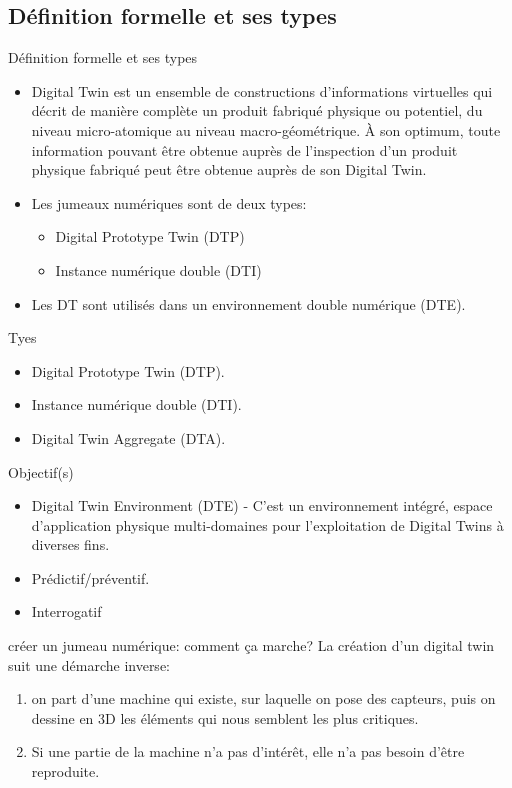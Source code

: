 \documentclass{beamer}
\begin{document}
   \subsection{Définition formelle et ses types}
 \begin{frame}{Définition formelle et ses types}
   \begin{itemize}
     \item Digital Twin est un ensemble de constructions d'informations virtuelles qui décrit de manière complète un produit fabriqué physique ou potentiel, du niveau micro-atomique au niveau macro-géométrique. À son optimum, toute information pouvant être obtenue auprès de l’inspection d’un produit physique fabriqué peut être obtenue auprès de son Digital Twin.
     \item Les jumeaux numériques sont de deux types:
       \begin{itemize}
         \item Digital Prototype Twin (DTP)
         \item Instance numérique double (DTI)
       \end{itemize}
     \item Les DT sont utilisés dans un environnement double numérique (DTE).
   \end{itemize}
  \end{frame}
 \begin{frame}{Tyes}
   \begin{itemize}
     \item Digital Prototype Twin (DTP).
     \item Instance numérique double (DTI).
     \item Digital Twin Aggregate (DTA).
   \end{itemize}
  \end{frame}
  \begin{frame}{Objectif(s)}
   \begin{itemize}
     \item Digital Twin Environment (DTE) - C’est un environnement intégré, espace d'application physique multi-domaines pour l'exploitation de Digital Twins à diverses fins.
     \item Prédictif/préventif.
     \item Interrogatif
   \end{itemize}
  \end{frame}
 \begin{frame}{créer un jumeau numérique: comment ça marche?}
  La création d'un digital twin suit une démarche inverse:
    \begin{enumerate}
      \item on part d'une machine qui existe, sur laquelle on pose des capteurs, puis on dessine en 3D les éléments 
   qui nous semblent les plus critiques.
      \item  Si une partie de la machine n'a pas d'intérêt, elle n'a pas besoin d'être reproduite.
    \end{enumerate} 
 \end{frame}
\end{document}
